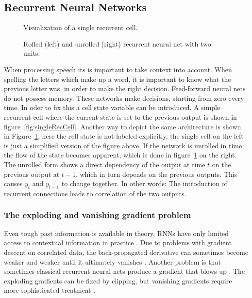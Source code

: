 \subsection{Recurrent Neural Networks}
\begin{figure}
\centering

\caption{Visualization of a single recurrent cell.}
\label{fig:singleRecCell}

\caption{Rolled (left) and unrolled (right) recurrent neural net with two units.}
\label{fig:unrolledNet}
\end{figure}
When processing speech its is important to take context into account. When spelling the letters which make up a word, it is important to know what the previous letter was, in order to make the right decision. 
Feed-forward neural nets do not possess memory. These networks make decisions, starting from zero every time. In oder to fix this a cell state variable can be introduced. A simple recurrent cell where the current state is set to the previous output is shown in figure~\ref{fig:singleRecCell}. Another way to depict the same architecture is shown in Figure~\ref{fig:unrolledNet}, here the cell state is not labeled explicitly, the single cell on the left is just a simplified version of the figure above. If the network is unrolled in time the flow of the state becomes apparent, which is done in figure~\ref{fig:unrolledNet} on the right.
The unrolled form shows a direct dependency of the output at time $t$ on the previous output at $t-1$, which in turn depends on the previous outputs. This causes $y_t$ and $y_{t-1}$ to change together. In other words: The introduction of recurrent connections leads to correlation of the two outputs. 


\subsubsection{The exploding and vanishing gradient problem}
Even tough past information is available in theory, RNNs have only limited access to contextual information in practice \cite[page 1]{Graves2008}. Due to problems with gradient descent on correlated data, the back-propagated derivative can sometimes become weaker and weaker until it ultimately vanishes \cite{Hochreiter1998}. Another problem is that sometimes classical recurrent neural nets produce a gradient that blows up \cite{Pascanu2012}. The exploding gradients can be fixed by clipping, but vanishing gradients require more sophisticated treatment \cite{Bengio1993}.     


